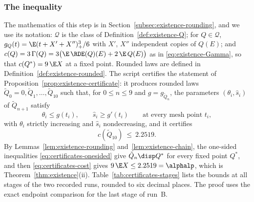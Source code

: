 \subsubsection*{The inequality}
The mathematics of this step is in Section~\ref{subsec:existence-rounding}, and we use its
notation: $\mathcal{Q}$ is the class of Definition~\ref{def:existence-Q}; for
$Q\in\mathcal{Q}$, $g_Q(t)=\E(t+X'+X'')_+^3/6$ with $X'$, $X''$ independent copies of $Q(E)$;
and $c(Q)=3\,\Gamma(Q)=3\bigl(\E\,\RDE(Q)(E)+2\,\E\,Q(E)\bigr)$ as in
\eqref{eq:existence-Gamma}, so that $c(Q^*)=9\,\E X$ at a fixed point. Rounded laws are
defined in Definition~\ref{def:existence-rounded}. The script
 certifies the statement of
Proposition~\ref{prop:existence-certificate}: it produces rounded laws
$\tilde Q_0=0,\tilde Q_1,\dots,\tilde Q_{10}$ such that, for $0\le n\le9$ and
$g=g_{\tilde Q_n}$, the parameters $(\theta_i,\hat s_i)$ of $\tilde Q_{n+1}$ satisfy
\begin{equation}\label{eq:certificates-onesided}
\theta_i\le g(t_i),\qquad \hat s_i\ge g'(t_i)\qquad\text{at every mesh point } t_i,
\end{equation}
with $\theta_i$ strictly increasing and $\hat s_i$ nondecreasing, and it certifies
\begin{equation}\label{eq:certificates-cost}
c(\tilde Q_{10})\ \le\ 2.2519 .
\end{equation}
By Lemmas~\ref{lem:existence-rounding} and~\ref{lem:existence-chain}, the one-sided
inequalities \eqref{eq:certificates-onesided} give $\tilde Q_n\disp Q^*$ for every fixed
point $Q^*$, and then \eqref{eq:certificates-cost} gives $9\,\E X\le2.2519=\alphalp$, which
is Theorem~\ref{thm:existence}(ii). Table~\ref{tab:certificates-stages} lists the bounds
at all stages of the two recorded runs, rounded to six decimal places. The proof uses the
exact endpoint comparison for the last stage of run~B.

